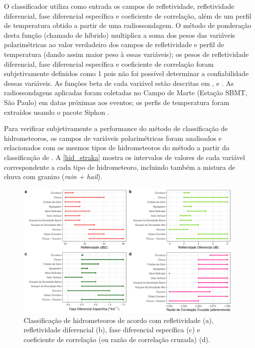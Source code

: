 O classificador utiliza como entrada os campos de refletividade, refletividade diferencial, fase diferencial específica e coeficiente de correlação, além de um perfil de temperatura obtido a partir de uma radiossondagem. O método de ponderação desta função (chamado de híbrido) multiplica a soma dos pesos das variáveis polarimétricas ao valor verdadeiro dos campos de refletividade e perfil de temperatura (dando assim maior peso à essas variáveis); os pesos de refletividade diferencial, fase diferencial específica e coeficiente de correlação foram subjetivamente definidos como 1 pois não foi possível determinar a confiabilidade dessas variáveis. As funções beta de cada variável estão descritas em ,  e . As radiossondagens aplicadas foram coletadas no Campo de Marte (Estação SBMT, São Paulo) em datas próximas aos eventos; os perfis de temperatura foram extraídos usando o pacote Siphon \cite{siphon}.

Para verificar subjetivamente a performance do método de classificação de hidrometeoros, os campos de variáveis polarimétricas foram analisados e relacionados com os mesmos tipos de hidrometeoros do método a partir da classificação de . A \autoref{hid_straka} mostra os intervalos de valores de cada variável correspondente a cada tipo de hidrometeoro, incluindo também a mistura de chuva com granizo (\textit{rain + hail}).

\begin{figure}[htb]
	\begin{center}
		\caption{Classificação de hidrometeoros de acordo com refletividade (a), refletividade diferencial (b), fase diferencial específica (c) e coeficiente de correlação (ou razão de correlação cruzada) (d).} 
		\label{hid_straka}
		\includegraphics[width=\columnwidth]{../General_Processing/figures/hids_strakaetal_ptbr.png}
	\end{center}
\end{figure}

